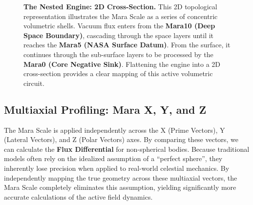 \documentclass[11pt, a4paper]{article}
\begin{document}
\begin{figure}[!ht]
{
  }
  \caption{\textbf{The Nested Engine: 2D Cross-Section.} This 2D topological representation illustrates the Mara Scale as a series of concentric volumetric shells. Vacuum flux enters from the \textbf{Mara10 (Deep Space Boundary)}, cascading through the space layers until it reaches the \textbf{Mara5 (NASA Surface Datum)}. From the surface, it continues through the sub-surface layers to be processed by the \textbf{Mara0 (Core Negative Sink)}. Flattening the engine into a 2D cross-section provides a clear mapping of this active volumetric circuit.}
  \label{fig:nested_spheres_2d}
\end{figure}

\clearpage
\subsection{Multiaxial Profiling: Mara X, Y, and Z}
The Mara Scale is applied independently across the X (Prime Vectors), Y (Lateral Vectors), and Z (Polar Vectors) axes. By comparing these vectors, we can calculate the \textbf{Flux Differential} for non-spherical bodies. Because traditional models often rely on the idealized assumption of a ``perfect sphere'', they inherently lose precision when applied to real-world celestial mechanics. By independently mapping the true geometry across these multiaxial vectors, the Mara Scale completely eliminates this assumption, yielding significantly more accurate calculations of the active field dynamics.
\end{document}

